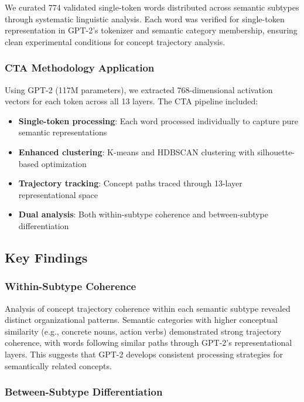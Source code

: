 We curated 774 validated single-token words distributed across semantic subtypes through systematic linguistic analysis. Each word was verified for single-token representation in GPT-2's tokenizer and semantic category membership, ensuring clean experimental conditions for concept trajectory analysis.

\subsubsection{CTA Methodology Application}

Using GPT-2 (117M parameters), we extracted 768-dimensional activation vectors for each token across all 13 layers. The CTA pipeline included:

\begin{itemize}
    \item \textbf{Single-token processing}: Each word processed individually to capture pure semantic representations
    \item \textbf{Enhanced clustering}: K-means and HDBSCAN clustering with silhouette-based optimization
    \item \textbf{Trajectory tracking}: Concept paths traced through 13-layer representational space
    \item \textbf{Dual analysis}: Both within-subtype coherence and between-subtype differentiation
\end{itemize}

\subsection{Key Findings}

\subsubsection{Within-Subtype Coherence}

Analysis of concept trajectory coherence within each semantic subtype revealed distinct organizational patterns. Semantic categories with higher conceptual similarity (e.g., concrete nouns, action verbs) demonstrated strong trajectory coherence, with words following similar paths through GPT-2's representational layers. This suggests that GPT-2 develops consistent processing strategies for semantically related concepts.

\subsubsection{Between-Subtype Differentiation}

